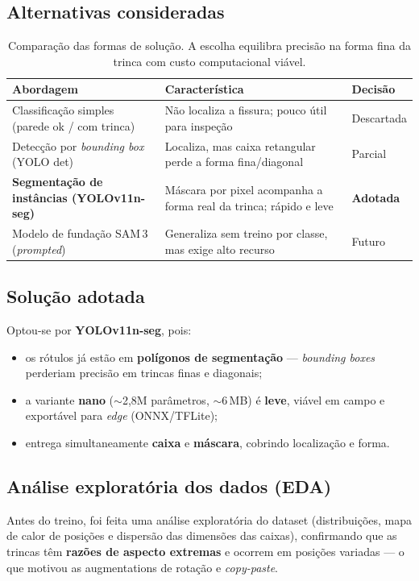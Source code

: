 \documentclass[11pt,a4paper]{article}
\begin{document}
\subsection{Alternativas consideradas}
\begin{table}[H]\centering\small
\renewcommand{\arraystretch}{1.3}
\begin{tabular}{>{\raggedright\arraybackslash}p{4.2cm} >{\raggedright\arraybackslash}p{7.5cm} >{\centering\arraybackslash}p{2.3cm}}
\toprule
\textbf{Abordagem} & \textbf{Característica} & \textbf{Decisão} \\
\midrule
Classificação simples (parede ok / com trinca) & Não localiza a fissura; pouco útil para inspeção & Descartada \\
Detecção por \emph{bounding box} (YOLO det) & Localiza, mas caixa retangular perde a forma fina/diagonal & Parcial \\
\textbf{Segmentação de instâncias (YOLOv11n-seg)} & Máscara por pixel acompanha a forma real da trinca; rápido e leve & \textbf{Adotada} \\
Modelo de fundação SAM\,3 (\emph{prompted}) & Generaliza sem treino por classe, mas exige alto recurso & Futuro \\
\bottomrule
\end{tabular}
\caption{Comparação das formas de solução. A escolha equilibra precisão na forma fina da
trinca com custo computacional viável.}
\end{table}

\subsection{Solução adotada}
Optou-se por \textbf{YOLOv11n-seg}, pois:
\begin{itemize}[leftmargin=1.4em]
  \item os rótulos já estão em \textbf{polígonos de segmentação} — \emph{bounding boxes}
        perderiam precisão em trincas finas e diagonais;
  \item a variante \textbf{nano} (\(\sim\)2,8M parâmetros, \(\sim\)6\,MB) é \textbf{leve},
        viável em campo e exportável para \emph{edge} (ONNX/TFLite);
  \item entrega simultaneamente \textbf{caixa} e \textbf{máscara}, cobrindo localização e forma.
\end{itemize}

\subsection{Análise exploratória dos dados (EDA)}
Antes do treino, foi feita uma análise exploratória do dataset (distribuições, mapa de calor
de posições e dispersão das dimensões das caixas), confirmando que as trincas têm
\textbf{razões de aspecto extremas} e ocorrem em posições variadas — o que motivou as
augmentations de rotação e \emph{copy-paste}.
\end{document}
